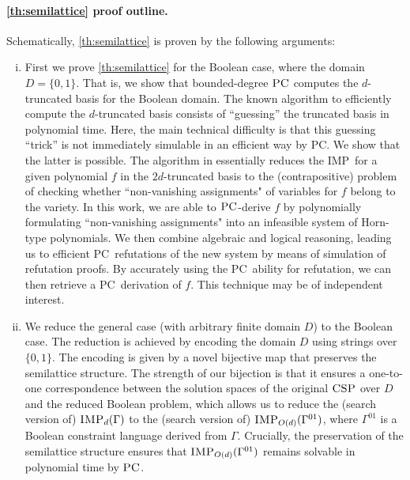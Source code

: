 \documentclass[11pt]{article}
\newcommand{\CSP}{\textsc{CSP}}
\newcommand{\IMP}{\textsc{IMP}}
\newcommand{\PC}{\textsc{PC}}
\newcommand{\1}{\textbf{1}}
\newcommand{\GB}{\text{Gr\"{o}bner} }
\begin{document}
\paragraph{\cref{th:semilattice} proof outline.}\label{sect:semilattice_structure}
%
Schematically, \cref{th:semilattice} is proven by the following arguments:
\begin{enumerate}[(i)]
    \item First we prove \cref{th:semilattice} for the Boolean case, where the domain $D = \{0,1\}$.
    That is, we show that bounded-degree $\PC$ computes the $d$-truncated \GB basis for the Boolean domain. The known \cite{Mastrolilli21TALG} algorithm to efficiently compute the $d$-truncated \GB basis consists of ``guessing'' the truncated \GB basis in polynomial time. Here, the main technical difficulty is that this guessing ``trick'' is not immediately simulable in an efficient way by \PC. We show that the latter is possible. The algorithm in \cite{Mastrolilli21TALG} essentially reduces the \IMP\ for a given polynomial $f$ in the $2d$-truncated \GB basis to the (contrapositive) problem of checking whether ``non-vanishing assignments" of variables for $f$ belong to the variety. In this work, we are able to $\PC$-derive $f$ by polynomially formulating ``non-vanishing assignments" into an infeasible system of Horn-type polynomials. We then combine algebraic and logical reasoning, leading us to efficient \PC\ refutations of the new system by means of simulation of refutation proofs. By accurately using the \PC\ ability for refutation, we can then retrieve a \PC\ derivation of $f$. This technique may be of independent interest.
    \item We reduce the general case (with arbitrary finite domain $D$) to the Boolean case. The reduction is achieved by encoding the domain $D$ using strings over $\{0,1\}$. The encoding is given by a novel bijective map that preserves the semilattice structure. The strength of our bijection is that it ensures a one-to-one correspondence between the solution spaces of the original $\CSP$ over $D$ and the reduced Boolean problem, which allows us to reduce the (search version of) $\IMP_d(\Gamma)$ to the (search version of) $\IMP_{O(d)}(\Gamma^{01})$, where $\Gamma^{01}$ is a Boolean constraint language derived from $\Gamma$. Crucially, the preservation of the semilattice structure ensures that $\IMP_{O(d)}(\Gamma^{01})$ remains solvable in polynomial time by $\PC$.
 
\end{enumerate}
\end{document}
